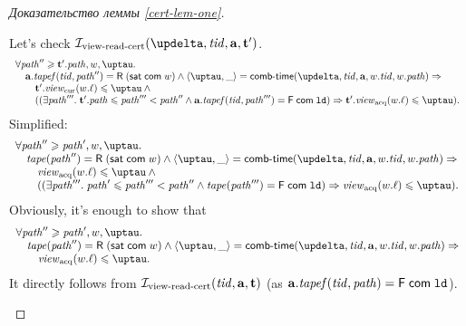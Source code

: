 \begin{proof}[Доказательство леммы \ref{cert-lem-one}]
\begin{itemize}
      Let's check $\invViewReadCERT(\delta, \tId, \aT, \tT')$.
      \[\begin{array}{l}
  \forall \cpath'' \ge \tT'.\cpath, \w, \tau. \\
\quad \aT.\tapef(\tId, \cpath'') = \tapeRead{(\tapeSatisfied{\Committed}{\w})} \land
   \angled{\tau, \_} = \deltaHmap(\delta, \tId, \aT, \w.\tId, \w.\cpath) \Rightarrow \\
\quad \quad \tT'.\Rcur(\w.\loc) \le \tau \land {} \\
\quad \quad ((\exists \cpath'''. \; \tT'.\cpath \le \cpath''' < \cpath'' \land 
             \aT.\tapef(\tId, \cpath''') = \tapeFence{\Committed}{\LD}) \Rightarrow \tT'.\Racq(\w.\loc) \le \tau). \\
      \end{array}\]
      Simplified:
      \[\begin{array}{l}
  \forall \cpath'' \ge \cpath', \w, \tau. \\
\quad \tape(\cpath'') = \tapeRead{(\tapeSatisfied{\Committed}{\w})} \land
   \angled{\tau, \_} = \deltaHmap(\delta, \tId, \aT, \w.\tId, \w.\cpath) \Rightarrow \\
\quad \quad \Racq(\w.\loc) \le \tau \land {} \\
\quad \quad ((\exists \cpath'''. \; \cpath' \le \cpath''' < \cpath'' \land 
             \tape(\cpath''') = \tapeFence{\Committed}{\LD}) \Rightarrow \Racq(\w.\loc) \le \tau). \\
      \end{array}\]
      Obviously, it's enough to show that
      \[\begin{array}{l}
  \forall \cpath'' \ge \cpath', \w, \tau. \\
\quad \tape(\cpath'') = \tapeRead{(\tapeSatisfied{\Committed}{\w})} \land
   \angled{\tau, \_} = \deltaHmap(\delta, \tId, \aT, \w.\tId, \w.\cpath) \Rightarrow \\
\quad \quad \Racq(\w.\loc) \le \tau.\\
      \end{array}\]
      It directly follows from $\mathcal{I}_{\textup{\rm view-read-cert}}(\mathit{tid}, \mathbf{a}, \mathbf{t})$ (as $\mathbf{a}.\mathit{tapef}(\mathit{tid}, \mathit{path}) = \textsf{F} \; \mathsf{com} \; \mathtt{ld}$).


\end{itemize}
\end{proof}
